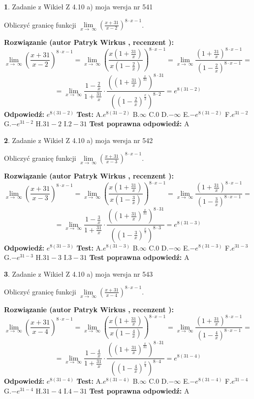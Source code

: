 \documentclass[12pt, a4paper]{article}
\theoremstyle{definition} %
\newtheorem{zad}{}
\newcommand{\zadStart}[1]{\begin{zad}#1\newline}
\newcommand{\zadStop}{\end{zad}}
\newcommand{\rozwStart}[2]{\noindent \textbf{Rozwiązanie (autor #1 , recenzent #2): }\newline}
\newcommand{\rozwStop}{\newline}
\newcommand{\odpStart}{\noindent \textbf{Odpowiedź:}\newline}
\newcommand{\odpStop}{\newline}
\newcommand{\testStart}{\noindent \textbf{Test:}\newline}
\newcommand{\testStop}{\newline}
\newcommand{\kluczStart}{\noindent \textbf{Test poprawna odpowiedź:}\newline}
\newcommand{\kluczStop}{\newline}
\begin{document}
\zadStart{Zadanie z Wikieł Z 4.10 a) moja wersja nr 541}


Obliczyć granicę funkcji  $\lim\limits_{x\to\ \infty}(\frac{x+31}{x-2})^{8\cdot x-1}$.
\zadStop
\rozwStart{Patryk Wirkus}{}
$$\lim\limits_{x\to\ \infty}(\frac{x+31}{x-2})^{8\cdot x-1} = \lim\limits_{x\to\ \infty}(\frac{x(1+\frac{31}{x})}{x(1-\frac{2}{x})})^{8\cdot x-1}=\lim\limits_{x\to\ \infty}\frac{(1+\frac{31}{x})^{8\cdot x-1}}{(1-\frac{2}{x})^{8\cdot x-1}}=$$
$$=\lim\limits_{x\to\ \infty}\frac{1-\frac{2}{x}}{1+\frac{31}{x}}\cdot\frac{((1+\frac{31}{x})^{\frac{x}{31}})^{8\cdot31}}{((1-\frac{2}{x})^{\frac{x}{2}})^{8\cdot2}}=e^{8(31-2)}$$
\rozwStop
\odpStart
$e^{8(31-2)}$
\odpStop
\testStart
A.$e^{8(31-2)}$ B.$\infty$ C.$0$ D.$-\infty$ E.$-e^{8(31-2)}$
F.$e^{31-2}$ G.$-e^{31-2}$
H.$31-2$
I.$2-31$
\testStop
\kluczStart
A
\kluczStop



\zadStart{Zadanie z Wikieł Z 4.10 a) moja wersja nr 542}


Obliczyć granicę funkcji  $\lim\limits_{x\to\ \infty}(\frac{x+31}{x-3})^{8\cdot x-1}$.
\zadStop
\rozwStart{Patryk Wirkus}{}
$$\lim\limits_{x\to\ \infty}(\frac{x+31}{x-3})^{8\cdot x-1} = \lim\limits_{x\to\ \infty}(\frac{x(1+\frac{31}{x})}{x(1-\frac{3}{x})})^{8\cdot x-1}=\lim\limits_{x\to\ \infty}\frac{(1+\frac{31}{x})^{8\cdot x-1}}{(1-\frac{3}{x})^{8\cdot x-1}}=$$
$$=\lim\limits_{x\to\ \infty}\frac{1-\frac{3}{x}}{1+\frac{31}{x}}\cdot\frac{((1+\frac{31}{x})^{\frac{x}{31}})^{8\cdot31}}{((1-\frac{3}{x})^{\frac{x}{3}})^{8\cdot3}}=e^{8(31-3)}$$
\rozwStop
\odpStart
$e^{8(31-3)}$
\odpStop
\testStart
A.$e^{8(31-3)}$ B.$\infty$ C.$0$ D.$-\infty$ E.$-e^{8(31-3)}$
F.$e^{31-3}$ G.$-e^{31-3}$
H.$31-3$
I.$3-31$
\testStop
\kluczStart
A
\kluczStop



\zadStart{Zadanie z Wikieł Z 4.10 a) moja wersja nr 543}


Obliczyć granicę funkcji  $\lim\limits_{x\to\ \infty}(\frac{x+31}{x-4})^{8\cdot x-1}$.
\zadStop
\rozwStart{Patryk Wirkus}{}
$$\lim\limits_{x\to\ \infty}(\frac{x+31}{x-4})^{8\cdot x-1} = \lim\limits_{x\to\ \infty}(\frac{x(1+\frac{31}{x})}{x(1-\frac{4}{x})})^{8\cdot x-1}=\lim\limits_{x\to\ \infty}\frac{(1+\frac{31}{x})^{8\cdot x-1}}{(1-\frac{4}{x})^{8\cdot x-1}}=$$
$$=\lim\limits_{x\to\ \infty}\frac{1-\frac{4}{x}}{1+\frac{31}{x}}\cdot\frac{((1+\frac{31}{x})^{\frac{x}{31}})^{8\cdot31}}{((1-\frac{4}{x})^{\frac{x}{4}})^{8\cdot4}}=e^{8(31-4)}$$
\rozwStop
\odpStart
$e^{8(31-4)}$
\odpStop
\testStart
A.$e^{8(31-4)}$ B.$\infty$ C.$0$ D.$-\infty$ E.$-e^{8(31-4)}$
F.$e^{31-4}$ G.$-e^{31-4}$
H.$31-4$
I.$4-31$
\testStop
\kluczStart
A
\kluczStop
\end{document}
